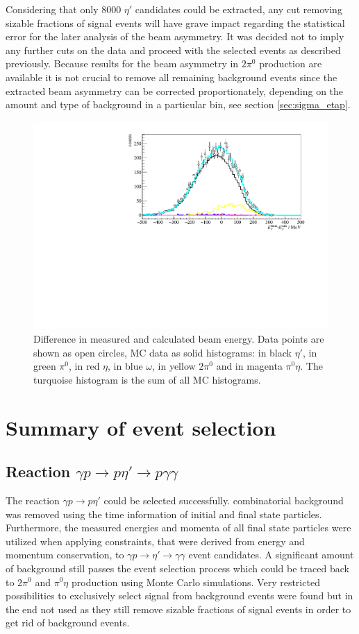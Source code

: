 \noindent Considering that only 8000 $\eta'$ candidates could be extracted, any cut removing sizable fractions of signal events will have grave impact regarding the statistical error for the later analysis of the beam asymmetry. It was decided not to imply any further cuts on the data and proceed with the selected events as described previously. Because results for the beam asymmetry in $2\pi^0$ production are available \cite{mahlbergphd} it is not crucial to remove all remaining background events since the extracted beam asymmetry can be corrected proportionately, depending on the amount and type of background in a particular bin, see section \ref{sec:sigma_etap}. 
\begin{figure}[htbp]
	\centering
	\includegraphics[width=\linewidth]{../figs/hydrogen/calc_beam.pdf}
	\caption{Difference in measured and calculated beam energy. Data points are shown as open circles, MC data as solid histograms: in black $\eta'$, in green $\pi^0$, in red $\eta$, in blue $\omega$, in yellow $2\pi^0$ and in magenta $\pi^0\eta$. The turquoise histogram is the sum of all MC histograms.}
	\label{fig:beame}
\end{figure}

\section{Summary of event selection}
\subsection{Reaction $\gamma p\to p\eta'\to p\gamma\gamma$}
The reaction $\gamma p\to p\eta'$ could be selected successfully. combinatorial background was removed using the time information of initial and final state particles. Furthermore, the measured energies and momenta of all final state particles were utilized when applying constraints, that were derived from energy and momentum conservation, to $\gamma p\to\eta'\to\gamma\gamma$ event candidates. A significant amount of background still passes the event selection process which could be traced back to $2\pi^0$ and $\pi^0\eta$ production using Monte Carlo simulations. Very restricted possibilities to exclusively select signal from background events were found but in the end not used as they still remove sizable fractions of signal events in order to get rid of background events.

